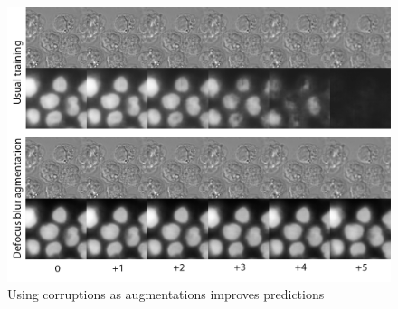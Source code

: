 \begin{figure}[htb]
	\begin{center}
		\includegraphics[width=\linewidth]{bilder/stability/augments-help.png}
		\caption{Using corruptions as augmentations improves predictions}\label{fig:augments-help}
	\end{center}
\end{figure}
